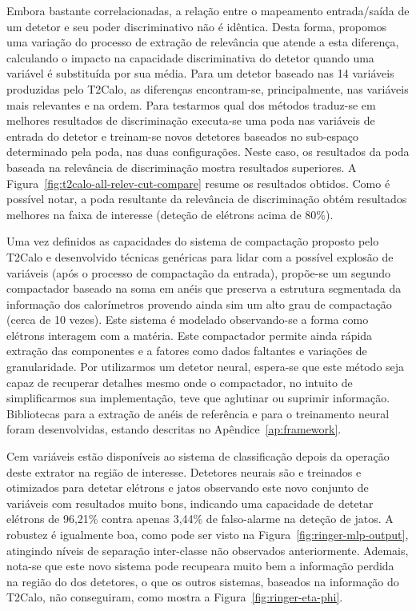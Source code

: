 Embora bastante correlacionadas, a relação entre o mapeamento entrada/saída de
um detetor e seu poder discriminativo não é idêntica. Desta forma, propomos
uma variação do processo de extração de relevância que atende a esta
diferença, calculando o impacto na capacidade discriminativa do detetor quando
uma variável é substituída por sua média. Para um detetor baseado nas 14
variáveis produzidas pelo T2Calo, as diferenças encontram-se, principalmente,
nas variáveis mais relevantes e na ordem. Para testarmos qual dos métodos
traduz-se em melhores resultados de discriminação executa-se uma poda nas
variáveis de entrada do detetor e treinam-se novos detetores baseados no
sub-espaço determinado pela poda, nas duas configurações. Neste caso, os
resultados da poda baseada na relevância de discriminação mostra resultados
superiores. A Figura~\ref{fig:t2calo-all-relev-cut-compare} resume os
resultados obtidos. Como é possível notar, a poda resultante da relevância de
discriminação obtém resultados melhores na faixa de interesse (deteção de
elétrons acima de 80\%).

Uma vez definidos as capacidades do sistema de compactação proposto pelo
T2Calo e desenvolvido técnicas genéricas para lidar com a possível explosão de
variáveis (após o processo de compactação da entrada), propõe-se um segundo
compactador baseado na soma em anéis que preserva a estrutura segmentada da
informação dos calorímetros provendo ainda sim um alto grau de compactação
(cerca de 10 vezes). Este sistema é modelado observando-se a forma como
elétrons interagem com a matéria. Este compactador permite ainda rápida
extração das componentes e a fatores como dados faltantes e variações de
granularidade. Por utilizarmos um detetor neural, espera-se que este método
seja capaz de recuperar detalhes mesmo onde o compactador, no intuito de
simplificarmos sua implementação, teve que aglutinar ou suprimir
informação. Bibliotecas para a extração de anéis de referência e para o
treinamento neural foram desenvolvidas, estando descritas no
Apêndice~\ref{ap:framework}.

Cem variáveis estão disponíveis ao sistema de classificação depois da operação
deste extrator na região de interesse. Detetores neurais são e treinados e
otimizados para detetar elétrons e jatos observando este novo conjunto de
variáveis com resultados muito bons, indicando uma capacidade de detetar
elétrons de 96,21\% contra apenas 3,44\% de falso-alarme na deteção de
jatos. A robustez é igualmente boa, como pode ser visto na
Figura~\ref{fig:ringer-mlp-output}, atingindo níveis de separação inter-classe
não observados anteriormente. Ademais, nota-se que este novo sistema pode
recupeara muito bem a informação perdida na região do  dos
detetores, o que os outros sistemas, baseados na informação do T2Calo, não
conseguiram, como mostra a Figura~\ref{fig:ringer-eta-phi}. 

